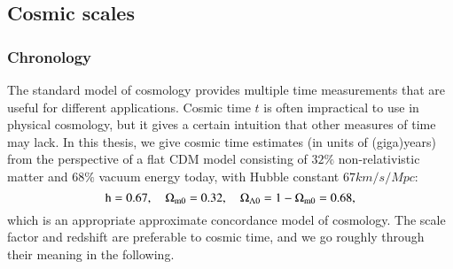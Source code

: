 \subsection{Cosmic scales}





    \subsubsection{Chronology}
    The standard model of cosmology provides multiple time measurements that are useful for different applications. 
    Cosmic time $t$ is often impractical to use in physical cosmology, but it gives a certain intuition that other measures of time may lack. In this thesis, we give cosmic time estimates (in units of (giga)years) from the perspective of a flat \textLambda{}CDM model consisting of $32\%$ non-relativistic matter and $68\%$ vacuum energy today, with Hubble constant $67\unit{km/s/Mpc}$: 
    \begin{equation}\label{eq:intro:prelim:cosmic_time_parameter_default}
        \mathrm{h}=0.67, \quad \Omega_\mathrm{m0} = 0.32, \quad \Omega_{\Lambda 0} = 1 -  \Omega_\mathrm{m0} = 0.68,
    \end{equation}
    which is an appropriate approximate concordance model of cosmology. The scale factor and redshift are preferable to cosmic time, and we go roughly through their meaning in the following.

